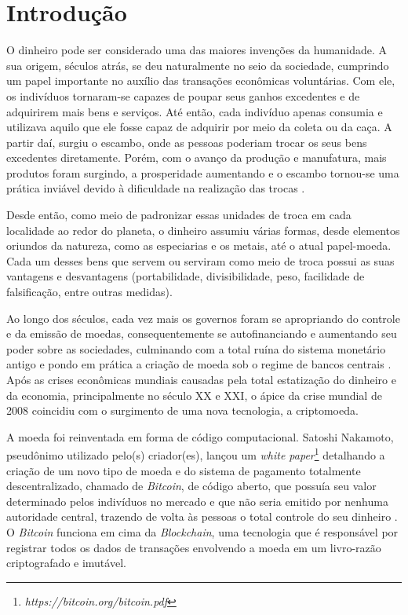 \chapter{Introdução}
\label{chap:introducao}

O dinheiro pode ser considerado uma das maiores invenções da humanidade. A sua origem, séculos atrás, se deu naturalmente no seio da sociedade, cumprindo um papel importante no auxílio das transações econômicas voluntárias. Com ele, os indivíduos tornaram-se capazes de poupar seus ganhos excedentes e de adquirirem mais bens e serviços. Até então, cada indivíduo apenas consumia e utilizava aquilo que ele fosse capaz de adquirir por meio da coleta ou da caça. A partir daí, surgiu o escambo, onde as pessoas poderiam trocar os seus bens excedentes diretamente. Porém, com o avanço da produção e manufatura, mais produtos foram surgindo, a prosperidade aumentando e o escambo tornou-se uma prática inviável devido à dificuldade na realização das trocas \cite{Schiff2012}. 

Desde então, como meio de padronizar essas unidades de troca em cada localidade ao redor do planeta, o dinheiro assumiu várias formas, desde elementos oriundos da natureza, como as especiarias e os metais, até o atual papel-moeda. Cada um desses bens que servem ou serviram como meio de troca possui as suas vantagens e desvantagens (portabilidade, divisibilidade, peso, facilidade de falsificação, entre outras medidas).

Ao longo dos séculos, cada vez mais os governos foram se apropriando do controle e da emissão de moedas, consequentemente se autofinanciando e aumentando seu poder sobre as  sociedades, culminando com a total ruína do sistema monetário antigo e pondo em prática a criação de moeda sob o regime de bancos centrais \cite{Ulrich2014}. Após as crises econômicas mundiais causadas pela total estatização do dinheiro e da economia, principalmente no século XX e XXI, o ápice da crise mundial de 2008 coincidiu com o surgimento de uma nova tecnologia, a criptomoeda.

A moeda foi reinventada em forma de código computacional. Satoshi Nakamoto, pseudônimo utilizado pelo(s) criador(es), lançou um \textit{white paper}\footnote{\em https://bitcoin.org/bitcoin.pdf} detalhando a criação de um novo tipo de moeda e do sistema de pagamento totalmente descentralizado, chamado de \textit{Bitcoin}, de código aberto, que possuía seu valor determinado pelos indivíduos no mercado e que não seria emitido por nenhuma autoridade central, trazendo de volta às pessoas o total controle do seu dinheiro \cite{Ulrich2014}. O \textit{Bitcoin} funciona em cima da \textit{Blockchain}, uma tecnologia que é responsável por registrar todos os dados de transações envolvendo a moeda em um livro-razão criptografado e imutável.

